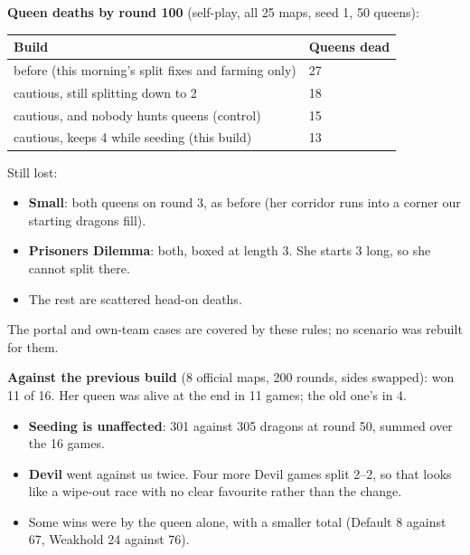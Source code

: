 \documentclass[11pt,a4paper]{article}
\begin{document}
\textbf{Queen deaths by round 100} (self-play, all 25 maps, seed 1, 50 queens):
\begin{center}
      \begin{tabular}{@{}ll@{}}
            \toprule
            Build                                                & Queens dead \\
            \midrule
            before (this morning's split fixes and farming only) & 27          \\
            cautious, still splitting down to 2                  & 18          \\
            cautious, and nobody hunts queens (control)          & 15          \\
            cautious, keeps 4 while seeding (this build)         & 13          \\
            \bottomrule
      \end{tabular}
\end{center}
Still lost:
\begin{itemize}
      \item \textbf{Small}: both queens on round 3, as before (her corridor runs into a corner our starting dragons fill).
      \item \textbf{Prisoners Dilemma}: both, boxed at length 3. She starts 3 long, so she cannot split there.
      \item The rest are scattered head-on deaths.
\end{itemize}
The portal and own-team cases are covered by these rules; no scenario was rebuilt for them.

\textbf{Against the previous build} (8 official maps, 200 rounds, sides swapped): won 11 of 16. Her queen was alive at the end in 11
games; the old one's in 4.
\begin{itemize}
      \item \textbf{Seeding is unaffected}: 301 against 305 dragons at round 50, summed over the 16 games.
      \item \textbf{Devil} went against us twice. Four more Devil games split 2--2, so that looks like a wipe-out race with no clear
            favourite rather than the change.
      \item Some wins were by the queen alone, with a smaller total (Default 8 against 67, Weakhold 24 against 76).
\end{itemize}



\end{document}
